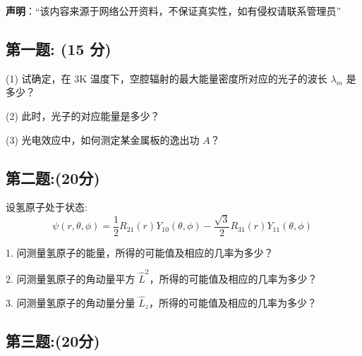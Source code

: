 
\textbf{声明}：“该内容来源于网络公开资料，不保证真实性，如有侵权请联系管理员”

\subsection{第一题: (15 分)}
(1) 试确定，在 3K 温度下，空腔辐射的最大能量密度所对应的光子的波长 $\lambda_m$ 是多少？

(2) 此时，光子的对应能量是多少？

(3) 光电效应中，如何测定某金属板的逸出功 $A$？
\subsection{第二题:(20分)}
设氢原子处于状态:$$\psi(r, \theta, \phi) = \frac{1}{2} R_{21}(r) Y_{10}(\theta, \phi) - \frac{\sqrt{3}}{2} R_{31}(r) Y_{11}(\theta, \phi)~$$

1. 问测量氢原子的能量，所得的可能值及相应的几率为多少？

2. 问测量氢原子的角动量平方 \( \hat{L}^2 \)，所得的可能值及相应的几率为多少？

3. 问测量氢原子的角动量分量 \( \hat{L}_z \)，所得的可能值及相应的几率为多少？
\subsection{第三题:(20分)}